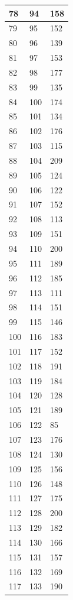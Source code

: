 \begin{tabular}{p{}p{}p{}}
\hline
78 & 94 & 158 \\
\hline
79 & 95 & 152 \\
\hline
80 & 96 & 139 \\
\hline
81 & 97 & 153 \\
\hline
82 & 98 & 177 \\
\hline
83 & 99 & 135 \\
\hline
84 & 100 & 174 \\
\hline
85 & 101 & 134 \\
\hline
86 & 102 & 176 \\
\hline
87 & 103 & 115 \\
\hline
88 & 104 & 209 \\
\hline
89 & 105 & 124 \\
\hline
90 & 106 & 122 \\
\hline
91 & 107 & 152 \\
\hline
92 & 108 & 113 \\
\hline
93 & 109 & 151 \\
\hline
94 & 110 & 200 \\
\hline
95 & 111 & 189 \\
\hline
96 & 112 & 185 \\
\hline
97 & 113 & 111 \\
\hline
98 & 114 & 151 \\
\hline
99 & 115 & 146 \\
\hline
100 & 116 & 183 \\
\hline
101 & 117 & 152 \\
\hline
102 & 118 & 191 \\
\hline
103 & 119 & 184 \\
\hline
104 & 120 & 128 \\
\hline
105 & 121 & 189 \\
\hline
106 & 122 & 85 \\
\hline
107 & 123 & 176 \\
\hline
108 & 124 & 130 \\
\hline
109 & 125 & 156 \\
\hline
110 & 126 & 148 \\
\hline
111 & 127 & 175 \\
\hline
112 & 128 & 200 \\
\hline
113 & 129 & 182 \\
\hline
114 & 130 & 166 \\
\hline
115 & 131 & 157 \\
\hline
116 & 132 & 169 \\
\hline
117 & 133 & 190 \\

\end{tabular}
